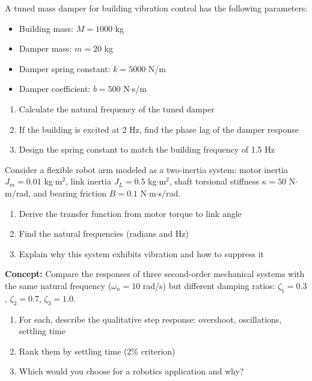 \begin{exercise}
A tuned mass damper for building vibration control has the following parameters:
\begin{itemize}
    \item Building mass: $M = 1000$ kg
    \item Damper mass: $m = 20$ kg
    \item Damper spring constant: $k = 5000$ N/m
    \item Damper coefficient: $b = 500$ N$\cdot$s/m
\end{itemize}

\begin{enumerate}[label=(\alph*)]
    \item Calculate the natural frequency of the tuned damper
    \item If the building is excited at 2 Hz, find the phase lag of the damper response
    \item Design the spring constant to match the building frequency of 1.5 Hz
\end{enumerate}
\end{exercise}

\begin{exercise}
Consider a flexible robot arm modeled as a two-inertia system: motor inertia $J_m = 0.01$ kg$\cdot$m$^2$, link inertia $J_L = 0.5$ kg$\cdot$m$^2$, shaft torsional stiffness $\kappa = 50$ N$\cdot$m/rad, and bearing friction $B = 0.1$ N$\cdot$m$\cdot$s/rad.

\begin{enumerate}[label=(\alph*)]
    \item Derive the transfer function from motor torque to link angle
    \item Find the natural frequencies (radians and Hz)
    \item Explain why this system exhibits vibration and how to suppress it
\end{enumerate}
\end{exercise}

\begin{exercise}
\textbf{Concept:} Compare the responses of three second-order mechanical systems with the same natural frequency ($\omega_n = 10$ rad/s) but different damping ratios: $\zeta_1 = 0.3$, $\zeta_2 = 0.7$, $\zeta_3 = 1.0$.

\begin{enumerate}[label=(\alph*)]
    \item For each, describe the qualitative step response: overshoot, oscillations, settling time
    \item Rank them by settling time (2\% criterion)
    \item Which would you choose for a robotics application and why?
\end{enumerate}
\end{exercise}

